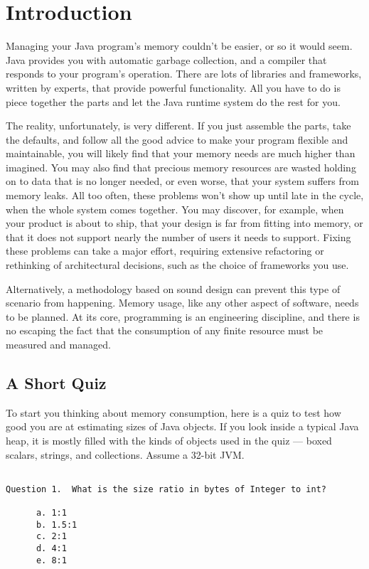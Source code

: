 
\chapter{Introduction}
\label{chapter:introduction}

Managing your Java program's memory couldn't be easier, or so it would seem.
Java provides you with automatic garbage collection, and a compiler that
responds to your program's operation. There are lots of libraries and frameworks,
written by experts, that provide powerful functionality. All you have
to do is piece together the parts and let the Java runtime system do the rest
for you.

The reality, unfortunately, is very different.  If you just assemble the parts,
take the defaults, and follow all the good advice to make your program flexible
and maintainable, you will likely find that your memory needs are much higher
than imagined. You may also find that precious memory resources are wasted
holding on to data that is no longer needed, or even worse, that your system
suffers from memory leaks. All too often, these problems won't show up until
late in the cycle, when the whole system comes together. You may discover, 
for example, when your product is about to ship, that your design is far from fitting into memory, 
or that it does not support nearly the number of users it
needs to support.  Fixing these problems can take a major effort, requiring
extensive refactoring or rethinking of architectural decisions, such as the
choice of frameworks you use.  

Alternatively, a methodology based on sound design can
prevent this type of scenario from happening. Memory usage, like any other
aspect of software, needs to be planned. At its core, programming is an engineering
discipline, and there is no escaping the fact that the consumption of any finite
resource must be measured and managed.


\section{A Short Quiz}

 To start you thinking about memory
consumption, here is a quiz to test how good you are at estimating sizes of Java objects. 
If you look inside a typical Java heap, it is mostly filled with the kinds of
objects used in the quiz --- boxed scalars, strings, and collections. Assume a 32-bit JVM.

\newpage

\begin{verbatim}

Question 1.  What is the size ratio in bytes of Integer to int?
   
      a. 1:1
      b. 1.5:1
      c. 2:1
      d. 4:1
      e. 8:1
      
\end{verbatim}

